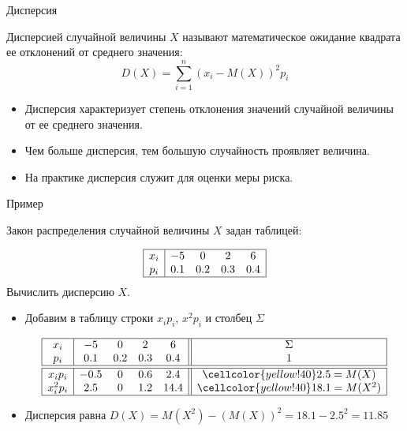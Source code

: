 \documentclass[unicode,11pt,notheorems,xcolor=table]{beamer}
\begin{document}
\begin{frame}{Дисперсия}{}
    \begin{block}{}
    Дисперсией случайной величины $X$ называют математическое ожидание квадрата ее отклонений от среднего значения:
    $$
        D(X) = \sum_{i=1}^n (x_i-M(X))^2p_i
    $$
    \end{block}

    \begin{itemize}
        \item Дисперсия характеризует степень отклонения значений случайной величины от ее среднего значения. 
        \item Чем больше дисперсия, тем большую случайность проявляет величина.
        \item На практике дисперсия служит для оценки меры риска.
    \end{itemize}
\end{frame}



\begin{frame}{Пример}
    \begin{exampleblock}{}
        Закон распределения случайной величины $X$ задан таблицей:

        $$
        \begin{array}{|c|cccc|}
            \hline
            x_i & -5 & 0 & 2 & 6 \\
            p_i & 0.1 & 0.2 & 0.3 & 0.4\\
            \hline
        \end{array}
        $$
        Вычислить дисперсию $X$.\par
    \end{exampleblock}

    \begin{itemize}
        \item Добавим в таблицу строки $x_ip_i$, $x^2p_i$ и столбец $\Sigma$

        $$
        \begin{array}{|c|cccc||c|}
            \hline
            x_i & -5 & 0 & 2 & 6 & \Sigma\\
            p_i & 0.1 & 0.2 & 0.3 & 0.4 & 1\\
            \hline
            \hline
            x_ip_i & -0.5 & 0 & 0.6 & 2.4 & \cellcolor{yellow!40} 2.5=M(X)\\
            x^2_ip_i & 2.5 & 0 & 1.2 & 14.4 & \cellcolor{yellow!40} 18.1=M(X^2)\\
            \hline
        \end{array}
        $$
        
        \item Дисперсия равна $D(X)=M(X^2)-(M(X))^2 = 18.1-2.5^2=11.85$
    \end{itemize}
\end{frame}
\end{document}
